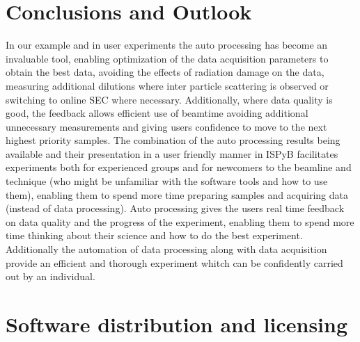 \documentclass[preprint,pdf]{iucr}              %
\begin{document}
\section{Conclusions and Outlook}
In our example and in user experiments the auto processing has become an invaluable tool, enabling optimization of the data acquisition parameters to obtain the best data, avoiding the effects of radiation damage on the data, measuring additional dilutions where inter particle scattering is observed or switching to online SEC where necessary. 
Additionally, where data quality is good, the feedback allows efficient use of beamtime avoiding additional unnecessary measurements and giving users confidence to move to the next highest priority samples. The combination of the auto processing results being available and their presentation in a user friendly manner in ISPyB facilitates experiments both for experienced groups and for newcomers to the beamline and technique (who might be unfamiliar with the software tools and how to use them), enabling them to spend more time preparing samples and acquiring data (instead of data processing). Auto processing gives the users real time feedback on data quality and the progress of the experiment, enabling them to spend more time thinking about their science and how to do the best experiment. Additionally the automation of data processing along with data acquisition provide an efficient and thorough experiment whitch can be confidently carried out by an individual.

\appendix
{}







\section{Software distribution and licensing}
\end{document}
